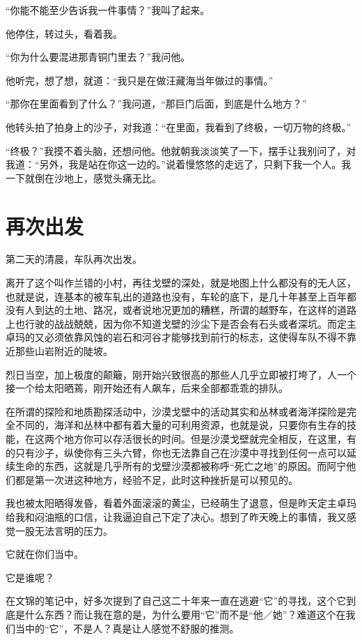 “你能不能至少告诉我一件事情？”我叫了起来。

他停住，转过头，看着我。

“你为什么要混进那青铜门里去？”我问他。

他听完，想了想，就道：“我只是在做汪藏海当年做过的事情。”

“那你在里面看到了什么？”我问道，“那巨门后面，到底是什么地方？”

他转头拍了拍身上的沙子，对我道：“在里面，我看到了终极，一切万物的终极。”

“终极？”我摸不着头脑，还想问他。他就朝我淡淡笑了一下，摆手让我别问了，对我道：“另外，我是站在你这一边的。”说着慢悠悠的走远了，只剩下我一个人。我一下就倒在沙地上，感觉头痛无比。

\chapter{再次出发}

第二天的清晨，车队再次出发。

离开了这个叫作兰错的小村，再往戈壁的深处，就是地图上什么都没有的无人区，也就是说，连基本的被车轧出的道路也没有，车轮的底下，是几十年甚至上百年都没有人到达的土地、路况，或者说地况更加的糟糕，所谓的越野车，在这样的道路上也行驶的战战兢兢，因为你不知道戈壁的沙尘下是否会有石头或者深坑。而定主卓玛的又必须依靠风蚀的岩石和河谷才能够找到前行的标志，这使得车队不得不靠近那些山岩附近的陡坡。

烈日当空，加上极度的颠簸，刚开始兴致很高的那些人几乎立即被打垮了，人一个接一个给太阳晒蔫，刚开始还有人飙车，后来全部都乖乖的排队。

在所谓的探险和地质勘探活动中，沙漠戈壁中的活动其实和丛林或者海洋探险是完全不同的，海洋和丛林中都有着大量的可利用资源，也就是说，只要你有生存的技能，在这两个地方你可以存活很长的时间。但是沙漠戈壁就完全相反，在这里，有的只有沙子，纵使你有三头六臂，你也无法靠自己在沙漠中寻找到任何一点可以延续生命的东西，这就是几乎所有的戈壁沙漠都被称呼“死亡之地”的原因。而阿宁他们都是第一次进这种地方，经验不足，此时这种挫折是可以预见的。

我也被太阳晒得发昏，看着外面滚滚的黄尘，已经萌生了退意，但是昨天定主卓玛给我和闷油瓶的口信，让我逼迫自己下定了决心。想到了昨天晚上的事情，我又感觉一股无法言明的压力。

它就在你们当中。

它是谁呢？

在文锦的笔记中，好多次提到了自己这二十年来一直在逃避“它”的寻找，这个它到底是什么东西？而让我在意的是，为什么要用“它”而不是“他／她”？难道这个在我们当中的“它”，不是人？真是让人感觉不舒服的推测。

